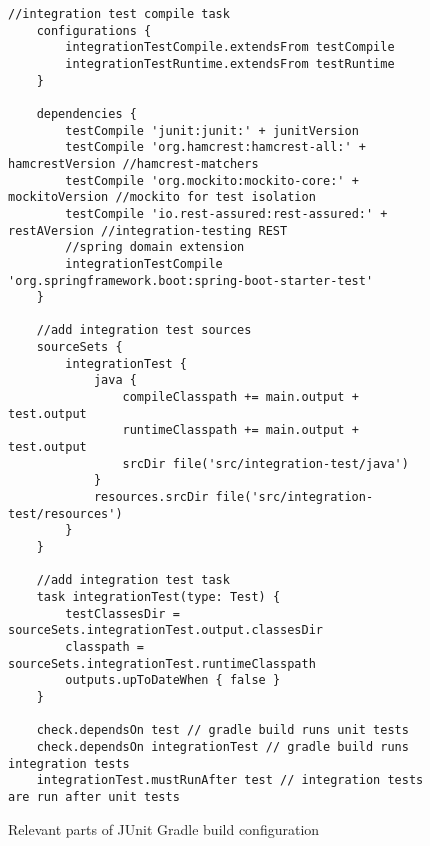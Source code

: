 \begin{figure}[H]
    \begin{lstlisting}[style=java]
    //integration test compile task
    configurations {
        integrationTestCompile.extendsFrom testCompile
        integrationTestRuntime.extendsFrom testRuntime
    }

    dependencies {
        testCompile 'junit:junit:' + junitVersion
        testCompile 'org.hamcrest:hamcrest-all:' + hamcrestVersion //hamcrest-matchers
        testCompile 'org.mockito:mockito-core:' + mockitoVersion //mockito for test isolation
        testCompile 'io.rest-assured:rest-assured:' + restAVersion //integration-testing REST
        //spring domain extension
        integrationTestCompile 'org.springframework.boot:spring-boot-starter-test'
    }

    //add integration test sources
    sourceSets {
        integrationTest {
            java {
                compileClasspath += main.output + test.output
                runtimeClasspath += main.output + test.output
                srcDir file('src/integration-test/java')
            }
            resources.srcDir file('src/integration-test/resources')
        }
    }

    //add integration test task
    task integrationTest(type: Test) {
        testClassesDir = sourceSets.integrationTest.output.classesDir
        classpath = sourceSets.integrationTest.runtimeClasspath
        outputs.upToDateWhen { false }
    }

    check.dependsOn test // gradle build runs unit tests
    check.dependsOn integrationTest // gradle build runs integration tests
    integrationTest.mustRunAfter test // integration tests are run after unit tests
    \end{lstlisting}
    \caption{Relevant parts of JUnit Gradle build configuration}
    \label{fig:junit-build}
\end{figure}

\restoregeometry

